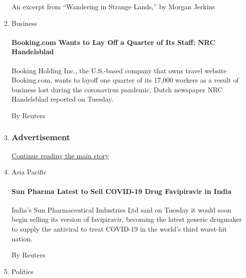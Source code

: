\begin{enumerate}
  An excerpt from ``Wandering in Strange Lands,'' by Morgan Jerkins
\item
  Business

  \href{/reuters/2020/08/04/business/04reuters-booking-hldg-jobs.html?searchResultPosition=4}{}

  \hypertarget{bookingcom-wants-to-lay-off-a-quarter-of-its-staff-nrc-handelsblad}{%
  \paragraph{Booking.com Wants to Lay Off a Quarter of Its Staff: NRC
  Handelsblad}\label{bookingcom-wants-to-lay-off-a-quarter-of-its-staff-nrc-handelsblad}}

  Booking Holding Inc., the U.S.-based company that owns travel website
  Booking.com, wants to layoff one quarter of its 17,000 workers as a
  result of business lost during the coronavirus pandemic, Dutch
  newspaper NRC Handelsblad reported on Tuesday.

  By Reuters
\item
  \hypertarget{advertisement}{%
  \subsubsection{Advertisement}\label{advertisement}}

  \protect\hyperlink{after-mid242}{Continue reading the main story}
\item
  Asia Pacific

  \href{/reuters/2020/08/04/world/asia/04reuters-health-coronavirus-india.html?searchResultPosition=5}{}

  \hypertarget{sun-pharma-latest-to-sell-covid-19-drug-favipiravir-in-india}{%
  \paragraph{Sun Pharma Latest to Sell COVID-19 Drug Favipiravir in
  India}\label{sun-pharma-latest-to-sell-covid-19-drug-favipiravir-in-india}}

  India's Sun Pharmaceutical Industries Ltd said on Tuesday it would
  soon begin selling its version of favipiravir, becoming the latest
  generic drugmaker to supply the antiviral to treat COVID-19 in the
  world's third worst-hit nation.

  By Reuters
\item
  Politics

  \href{/reuters/2020/08/04/us/politics/04reuters-health-coronavirus-usa-congress.html?searchResultPosition=6}{}


\end{enumerate}
